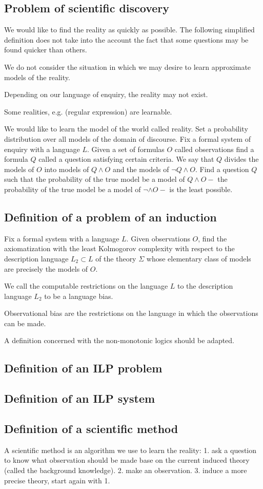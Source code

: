 \subsection{Problem of scientific discovery}
We would like to find the reality as quickly as possible. The following simplified definition does not take into the account the fact that some questions may be found quicker than others.

We do not consider the situation in which we may desire to learn approximate models of the reality.

Depending on our language of enquiry, the reality may not exist.

Some realities, e.g. (regular expression) are learnable.

We would like to learn the model of the world called reality. Set a probability distribution over all models of the domain of discourse. Fix a formal system of enquiry with a language $L$. Given a set of formulas $O$ called observations find a formula $Q$ called a question satisfying certain criteria.
We say that $Q$ divides the models of $O$ into models of $Q \wedge O$ and the models of $\neg Q \wedge O$. Find a question $Q$ such that the probability of the true model be a model of $Q \wedge O \minus$ the probability of the true model be a model of $\neg \wedge O \minus$ is the least possible.

\subsection{Definition of a problem of an induction}
Fix a formal system with a language $L$. Given observations $O$, find the axiomatization with the least Kolmogorov complexity with respect to the description language $L_2 \subset L$ of the theory $\Sigma$ whose elementary class of models are precisely the models of $O$.

We call the computable restrictions on the language $L$ to the description language $L_2$ to be a language bias.

Observational bias are the restrictions on the language in which the observations can be made.

A definition concerned with the non-monotonic logics should be adapted.

\subsection{Definition of an ILP problem}

\subsection{Definition of an ILP system}

\subsection{Definition of a scientific method}
A scientific method is an algorithm we use to learn the reality:
1. ask a question to know what observation should be made base on the current induced theory (called the background knowledge).
2. make an observation.
3. induce a more precise theory, start again with 1.